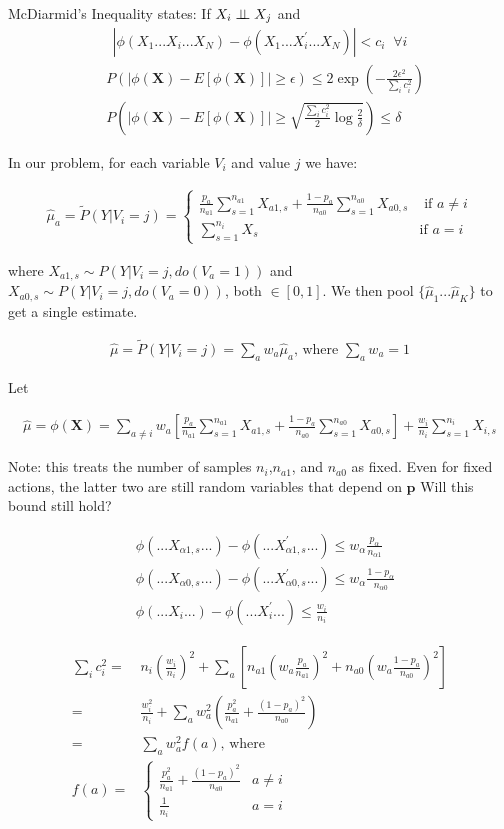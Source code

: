 \documentclass{article}
\newcommand{\eqn}[1]{\begin{align}#1\end{align}}
\theoremstyle{plain}
\theoremstyle{definition}
\begin{document}
McDiarmid's Inequality states:
If $X_i \perp\!\!\!\perp X_j$ and 
\eqn{
|\phi(X_1...X_i...X_N) - \phi(X_1...X_i^{'}...X_N)| < c_i \;\; \forall i
}
\eqn{
& P\left(|\phi(\boldsymbol{X}) - E[\phi(\boldsymbol{X})]| \geq \epsilon \right) \leq 2 \exp \left(-\frac{2 \epsilon^2}{\sum_{i}c_i^2} \right)\\
\label{eqn:McDiarmid}
& P\left(|\phi(\boldsymbol{X}) - E[\phi(\boldsymbol{X})]| \geq 
\sqrt{\frac{\sum_{i}c_i^2}{2}\log{\frac{2}{\delta}}} 
\right) \leq \delta
}


In our problem, for each variable $V_i$ and value $j$ we have:

\eqn{
\hat{\mu}_a = \tilde{P}(Y|V_i = j)= \begin{cases}
\frac{p_a}{n_{a1}}\sum_{s=1}^{n_{a1}}X_{a1,s} + \frac{1-p_a}{n_{a0}}\sum_{s=1}^{n_{a0}}X_{a0,s} & \text{ if $a \neq i$}\\
\sum_{s=1}^{n_i}X_s & \text{if $a = i$}
\end{cases}
}

where $X_{a1,s}  \sim P(Y|V_i = j, do(V_a = 1))$ and $X_{a0,s}  \sim P(Y|V_i = j, do(V_a = 0))$, both $\in [0,1]$. We then pool $\{\hat{\mu}_1 ... \hat{\mu}_K \}$ to get a single estimate.

\eqn {
\hat{\mu} = \tilde{P}(Y|V_i = j)= \sum_a w_a \hat{\mu}_a \text{, where } \sum_a w_a = 1
}

Let 

\eqn {
\hat{\mu} = \phi(\boldsymbol{X}) = \sum_{a \neq i} w_a \left[ 
\frac{p_a}{n_{a1}}\sum_{s=1}^{n_{a1}}X_{a1,s} + \frac{1-p_a}{n_{a0}}\sum_{s=1}^{n_{a0}}X_{a0,s}
\right] + \frac{w_i}{n_i} \sum_{s=1}^{n_i}X_{i,s}
}

Note: this treats the number of samples $n_i$,$n_{a1}$, and $n_{a0}$ as fixed. Even for fixed actions, the latter two are still random variables that depend on $\boldsymbol{p}$  Will this bound still hold?  



\eqn {
&\phi(...X_{\alpha 1,s}...) - \phi(...X_{\alpha 1,s}^{'}...) \leq w_\alpha \frac{p_\alpha}{n_{\alpha 1}} \\
&\phi(...X_{\alpha 0,s}...) - \phi(...X_{\alpha 0,s}^{'}...) \leq w_\alpha \frac{1-p_\alpha}{n_{\alpha 0}}\\
& \phi(...X_i...) - \phi(...X_i^{'}...) \leq \frac{w_i}{n_i}
}


\eqn{
\sum_i c_i^2 = & n_i \left(\frac{w_i}{n_i}\right)^2+ \sum_a \left[ n_{a1}\left(w_a \frac{p_a}{n_{a1}}\right)^2 + n_{a0}\left(w_a \frac{1-p_a}{n_{a0}}\right)^2\right]\\
= & \frac{w_i^2}{n_i}+ \sum_a w_a^2 \left(\frac{p_a^2}{n_{a1}}+  \frac{(1-p_a)^2}{n_{a0}} \right) \\
\label{eq:tominimize}
= & \sum_a w_a^2 f(a) \text{, where }\\ 
f(a) =& \begin{cases}
\frac{p_a^2}{n_{a1}}+  \frac{(1-p_a)^2}{n_{a0}}  & a \neq i\\
\frac{1}{n_i} & a = i
\end{cases}
}
\end{document}
